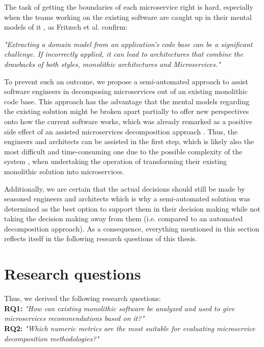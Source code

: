\documentclass[12pt,a4paper]{report}
\begin{document}
The task of getting the boundaries of each microservice right is hard,
especially when the teams working on the existing software
are caught up in their mental models of it \cite{latoza2006maintaining},
as Fritzsch et al. confirm:
\begin{displayquote}
\emph{"Extracting a domain model from an application's code base
can be a significant challenge. If incorrectly applied,
it can lead to architectures that combine the drawbacks of both styles,
monolithic architectures and Microservices."}~\cite{fritzsch2018monolith}
\end{displayquote}
To prevent such an outcome, we propose a semi-automated approach to assist
software engineers in decomposing microservices out of an existing monolithic code base.
This approach has the advantage that the mental models regarding the existing
solution might be broken apart partially to offer new perspectives onto how
the current software works, which was already remarked as a positive side effect
of an assisted microservices decomposition approach \cite{gysel2016service}.
Thus, the engineers and architects can be assisted in the first step,
which is likely also the most difficult and time-consuming one due to the possible
complexity of the system \cite{fritzsch2018monolith, france2007model},
when undertaking the operation of transforming their existing
monolithic solution into microservices.

Additionally, we are certain that the actual decisions should still be made
by seasoned engineers and architects which is why a semi-automated solution
was determined as the best option to support them in their
decision making while not taking the decision making away from them
(i.e. compared to an automated decomposition approach).
As a consequence, everything mentioned in this section reflects itself in
the following research questions of this thesis.



\section{Research questions}

\hangindent=1cm
\noindent Thus, we derived the following research questions:\\
\textbf{RQ1:} \textit{"How can existing monolithic software be analyzed
and used to give microservices recommendations based on it?"}\\
\textbf{RQ2:} \textit{"Which numeric metrics are the most suitable
for evaluating microservice decomposition methodologies?"}
\end{document}
